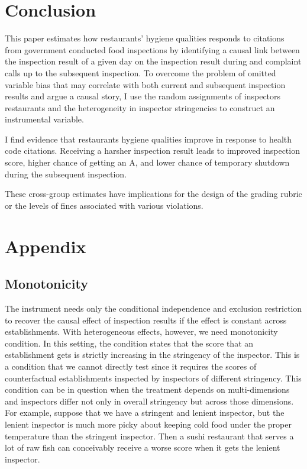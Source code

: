 \documentclass[12pt]{article}
\begin{document}
\section{Conclusion}
\label{conclude}
This paper estimates how restaurants' hygiene qualities responds to citations from government conducted food inspections by identifying a causal link between the inspection result of a given day on the inspection result during and complaint calls up to the subsequent inspection. To overcome the problem of omitted variable bias that may correlate with both current and subsequent inspection results and argue a causal story, I use the random assignments of inspectors restaurants and the heterogeneity in inspector stringencies to construct an instrumental variable. 

I find evidence that restaurants hygiene qualities improve in response to health code citations. Receiving a harsher inspection result leads to improved inspection score, higher chance of getting an A, and lower chance of temporary shutdown during the subsequent inspection. 

These cross-group estimates have implications for the design of the grading rubric or the levels of fines associated with various violations.


\newpage





\newpage

\section{Appendix}

\subsection{Monotonicity}

The instrument needs only the conditional independence and exclusion restriction to recover the causal effect of inspection results if the effect is constant across establishments. With heterogeneous effects, however, we need monotonicity condition. In this setting, the condition states that the score that an establishment gets is strictly increasing in the stringency of the inspector. This is a condition that we cannot directly test since it requires the scores of counterfactual establishments inspected by inspectors of different stringency. This condition can be in question when the treatment depends on multi-dimensions and inspectors differ not only in overall stringency but across those dimensions. For example, suppose that we have a stringent and lenient inspector, but the lenient inspector is much more picky about keeping cold food under the proper temperature than the stringent inspector. Then a sushi restaurant that serves a lot of raw fish can conceivably receive a worse score when it gets the lenient inspector. 
\end{document}
